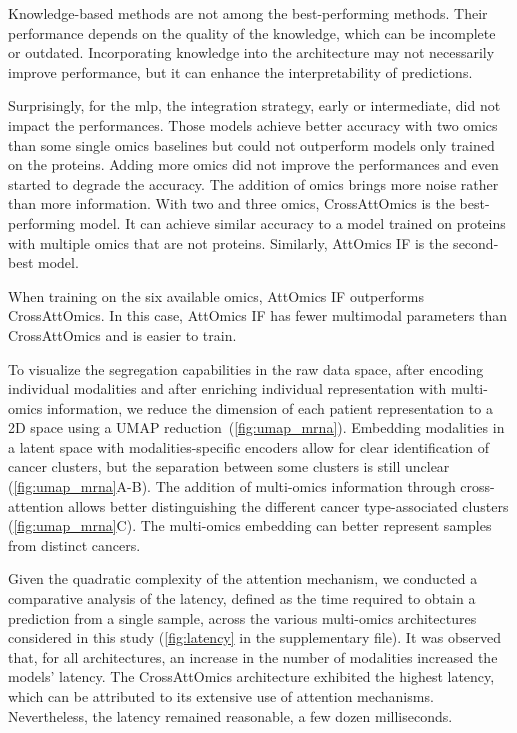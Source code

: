 \documentclass[../main.tex]{subfiles}
\begin{document}
     Knowledge-based methods are not among the best-performing methods.
     Their performance depends on the quality of the knowledge, which can be incomplete or outdated.
     Incorporating knowledge into the architecture may not necessarily improve performance, but it can enhance the interpretability of predictions.

     Surprisingly, for the \gls{mlp}, the integration strategy, early or intermediate, did not impact the performances.
     Those models achieve better accuracy with two omics than some single omics baselines but could not outperform models only trained on the proteins.
     Adding more omics did not improve the performances and even started to degrade the accuracy.
     The addition of omics brings more noise rather than more information.
     With two and three omics, CrossAttOmics is the best-performing model.
     It can achieve similar accuracy to a model trained on proteins with multiple omics that are not proteins.
     Similarly, AttOmics IF is the second-best model.

     When training on the six available omics, AttOmics IF outperforms CrossAttOmics.
     In this case, AttOmics IF has fewer multimodal parameters than CrossAttOmics and is easier to train.

     To visualize the segregation capabilities in the raw data space, after encoding individual modalities and after enriching individual representation with multi-omics information, we reduce the dimension of each patient representation to a 2D space using a UMAP reduction~(\cref{fig:umap_mrna}).
     Embedding modalities in a latent space with modalities-specific encoders allow for clear identification of cancer clusters, but the separation between some clusters is still unclear (\cref{fig:umap_mrna}A-B).
     The addition of multi-omics information through cross-attention allows better distinguishing the different cancer type-associated clusters (\cref{fig:umap_mrna}C).
     The multi-omics embedding can better represent samples from distinct cancers.


     Given the quadratic complexity of the attention mechanism, we conducted a comparative analysis of the latency, defined as the time required to obtain a prediction from a single sample, across the various multi-omics architectures considered in this study (\cref{fig:latency} in the supplementary file).
     It was observed that, for all architectures, an increase in the number of modalities increased the models' latency.
     The CrossAttOmics architecture exhibited the highest latency, which can be attributed to its extensive use of attention mechanisms. Nevertheless, the latency remained reasonable,  a few dozen milliseconds.
\end{document}
